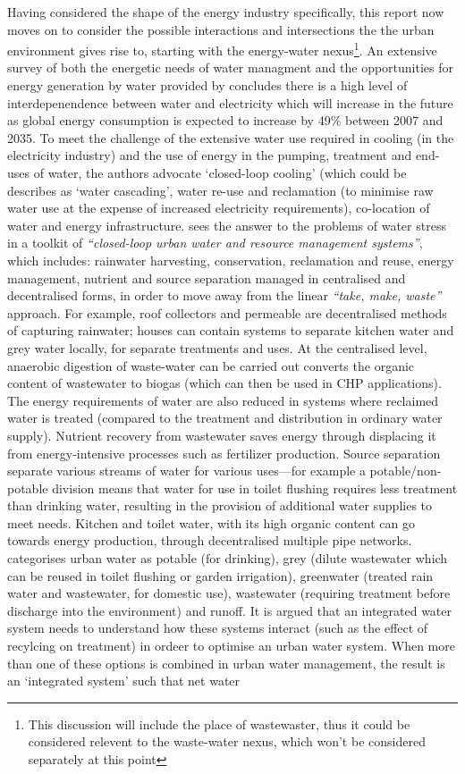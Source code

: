 Having considered the shape of the energy industry specifically, this report now moves on to consider the possible interactions and intersections the the urban environment gives rise to, starting with the energy-water nexus\footnote{This discussion will include the place of wastewaster, thus it could be considered relevent to the waste-water nexus, which won't be considered separately at this point}. An extensive survey of both the energetic needs of water managment and the opportunities for energy generation by water provided by \citep{McMahon2011} concludes there is a high level of interdepenendence between water and electricity which will increase in the future as global energy consumption is expected to increase by 49\% between 2007 and 2035. To meet the challenge of the extensive water use required in cooling (in the electricity industry) and the use of energy in the pumping, treatment and end-uses of water, the authors advocate `closed-loop cooling' (which could be describes as `water cascading', water re-use and reclamation (to minimise raw water use at the expense of increased electricity requirements), co-location of water and energy infrastructure. \citet{Daigger2009} sees the answer to the problems of water stress in a toolkit of \emph{``closed-loop urban water and resource management systems''}, which includes: rainwater harvesting, conservation, reclamation and reuse, energy management, nutrient and source separation managed in centralised and decentralised forms, in order to move away from the linear \emph{``take, make, waste''} approach. For example, roof collectors and permeable are decentralised methods of capturing rainwater; houses can contain systems to separate kitchen water and grey water locally, for separate treatments and uses. At the centralised level, anaerobic digestion of waste-water can be carried out converts the organic content of wastewater to biogas (which can then be used in CHP applications). The energy requirements of water are also reduced in systems where reclaimed water is treated (compared to the treatment and distribution in ordinary water supply). Nutrient recovery from wastewater saves energy through displacing it from  energy-intensive processes such as fertilizer production. Source separation separate various streams of water for various uses---for example a potable/non-potable division means that water for use in toilet flushing requires less treatment than drinking water, resulting in the provision of additional water supplies to meet needs. Kitchen and toilet water, with its high organic content can go towards energy production, through decentralised multiple pipe networks. \citet{Makropoulos2008} categorises urban water as potable (for drinking), grey (dilute wastewater which can be reused in toilet flushing or garden irrigation), greenwater (treated rain water and wastewater, for domestic use), wastewater (requiring treatment before discharge into the environment) and runoff. It is argued that an integrated water system needs to understand how these systems interact (such as the effect of recylcing on treatment) in ordeer to optimise an urban water system. When more than one of these options is combined in urban water management, the result is an `integrated system' such that net water 